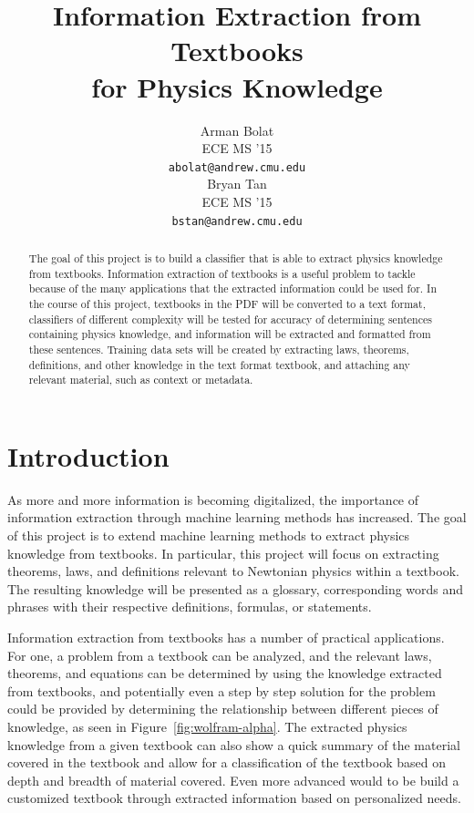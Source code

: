 \documentclass{article} %
\title{Information Extraction from Textbooks \\ for Physics Knowledge}
\author{
Arman Bolat \\
ECE MS '15 \\
\texttt{abolat@andrew.cmu.edu} \\
\And
Bryan Tan \\
ECE MS '15 \\
\texttt{bstan@andrew.cmu.edu} \\
}
\begin{document}
\maketitle


\begin{abstract}
The goal of this project is to build a classifier that is able to extract physics knowledge from textbooks. Information extraction of textbooks is a useful problem to tackle because of the many applications that the extracted information could be used for. In the course of this project, textbooks in the PDF will be converted to a text format, classifiers of different complexity will be tested for accuracy of determining sentences containing physics knowledge, and information will be extracted and formatted from these sentences. Training data sets will be created by extracting laws, theorems, definitions, and other knowledge in the text format textbook, and attaching any relevant material, such as context or metadata.
\end{abstract}

\section{Introduction}

As more and more information is becoming digitalized, the importance of information extraction through machine learning methods has increased. The goal of this project is to extend machine learning methods to extract physics knowledge from textbooks. In particular, this project will focus on extracting theorems, laws, and definitions relevant to Newtonian physics within a textbook. The resulting knowledge will be presented as a glossary, corresponding words and phrases with their respective definitions, formulas, or statements.

Information extraction from textbooks has a number of practical applications. For one, a problem from a textbook can be analyzed, and the relevant laws, theorems, and equations can be determined by using the knowledge extracted from textbooks, and potentially even a step by step solution for the problem could be provided by determining the relationship between different pieces of knowledge, as seen in Figure~\ref{fig:wolfram-alpha}. The extracted physics knowledge from a given textbook can also show a quick summary of the material covered in the textbook and allow for a classification of the textbook based on depth and breadth of material covered. Even more advanced would to be build a customized textbook through extracted information based on personalized needs.
\end{document}

